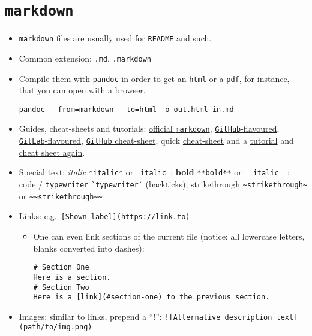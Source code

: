 \documentclass[a4paper,12pt,%
              final%
              ]{article}
\begin{document}
\section{\texttt{markdown}}
\label{sec:markdown}
\begin{itemize}
  \item \texttt{markdown} files are usually used for \texttt{README} and such.
  \item Common extension: \texttt{.md}, \texttt{.markdown}
  \item Compile them with \texttt{pandoc} in order to get an \texttt{html} or a \texttt{pdf}, for instance, that you can open with a browser.
\begin{verbatim}
pandoc --from=markdown --to=html -o out.html in.md
\end{verbatim}
  \item Guides, cheat-sheets and tutorials:
    \href{https://daringfireball.net/projects/markdown/syntax}{official \texttt{markdown}},
    \href{https://docs.github.com/en/github/writing-on-github/basic-writing-and-formatting-syntax}{\texttt{GitHub}-flavoured},
    \href{https://docs.gitlab.com/ee/user/markdown.html}{\texttt{GitLab}-flavoured},
    \href{https://github.com/adam-p/markdown-here/wiki/Markdown-Cheatsheet}{\texttt{GitHub} cheat-sheet},
    quick \href{https://commonmark.org/help/}{cheat-sheet} and a
    \href{https://agea.github.io/tutorial.md/}{tutorial} and
    \href{https://enterprise.github.com/downloads/en/markdown-cheatsheet.pdf}{cheat sheet again}.
  \item Special text: \textit{italic} \verb|*italic*| or \verb|_italic_|; \textbf{bold} \verb|**bold**| or \verb|__italic__|; code / \texttt{typewriter} \verb|`typewriter`| (backticks); \sout{strikethrough} \verb|~strikethrough~| or \verb|~~strikethrough~~|
  \item Links: e.g.\ \verb|[Shown label](https://link.to)|
    \begin{itemize}
      \item One can even link sections of the current file (notice: all lowercase letters, blanks converted into dashes):
\begin{verbatim}
# Section One
Here is a section.
# Section Two
Here is a [link](#section-one) to the previous section.
\end{verbatim}
    \end{itemize}
  \item Images: similar to links, prepend a ``!'': \verb|![Alternative description text](path/to/img.png)|
    \begin{itemize}

\end{itemize}
\end{itemize}
\end{document}
